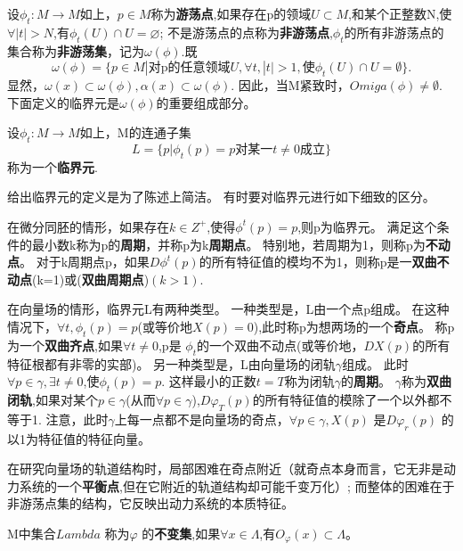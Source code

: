 \begin{defination}
  设\(\phi_t:M\to M\)如上，\(p \in M\)称为\textbf{游荡点},如果存在p的领域\(U\subset M\),和某个正整数N,使\(\forall |t|>N\),有\(\phi_t(U)\cap U=\varnothing\);
  不是游荡点的点称为\textbf{非游荡点},\(\phi_t\)的所有非游荡点的集合称为\textbf{非游荡集}，记为\(\omega(\phi)\).既
  \[
    \omega(\phi)=\{
    p \in M| \text{对p的任意领域} U,\forall t ,|t|>1,\text{使} \phi_t(U)
    \cap U =\emptyset
    \}.
  \]
显然，\(\omega(x)\subset \omega (\phi),\alpha(x)\subset\omega (\phi)\).
因此，当M紧致时，\(Omiga(\phi)\neq \emptyset\).
下面定义的临界元是\(\omega(\phi)\)的重要组成部分。
\end{defination}

\begin{defination}
  设\(\phi_t:M\to M\)如上，M的连通子集
  \[L=\{p|\phi_t(p)=p对某一t\neq 0成立\}\]
  称为一个\textbf{临界元}.
\end{defination}
给出临界元的定义是为了陈述上简洁。
有时要对临界元进行如下细致的区分。


在微分同胚的情形，如果存在\(k \in Z^+\),使得\(\phi^t(p)=p\),则p为临界元。
满足这个条件的最小数k称为p的\textbf{周期}，并称p为k\textbf{周期点}。
特别地，若周期为1，则称p为\textbf{不动点}。
对于k周期点p，如果\(D\phi^t(p)\)的所有特征值的模均不为1，则称p是一\textbf{双曲不动点}(k=1)或(\textbf{双曲周期点})\((k>1)\).


在向量场的情形，临界元L有两种类型。
一种类型是，L由一个点p组成。
在这种情况下，\(\forall t,\phi_t(p)=p\)(或等价地\(X(p)=0\)),此时称p为想两场的一个\textbf{奇点}。
称p为一个\textbf{双曲齐点},如果\(\forall t \neq 0\),p是 \(\phi_t\)的一个双曲不动点(或等价地，\(DX(p)\)的所有特征根都有非零的实部)。
另一种类型是，L由向量场的闭轨\(\gamma\)组成。
此时\(\forall p \in \gamma , \exists t \neq 0\),使\(\phi_t ( p ) = p\).
这样最小的正数\(t=T\)称为闭轨\(\gamma\)的\textbf{周期}。
\(\gamma\)称为\textbf{双曲闭轨},如果对某个\(p \in \gamma \)(从而\( \forall p \in \gamma\)),\(D \varphi _ { T } ( p )\)的所有特征值的模除了一个以外都不等于1.
注意，此时\(\gamma\)上每一点都不是向量场的奇点，\(\forall p \in \gamma , X ( p ) \) 是\( D\varphi _ { r } ( p )\) 的以1为特征值的特征向量。


在研究向量场的轨道结构时，局部困难在奇点附近（就奇点本身而言，它无非是动力系统的一个\textbf{平衡点},但在它附近的轨道结构却可能千变万化）;
而整体的困难在于非游荡点集的结构，它反映出动力系统的本质特征。

\begin{defination}
  M中集合\(Lambda\) 称为\(\varphi\) 的\textbf{不变集},如果\(\forall x \in \Lambda\),有$O _ { \varphi } ( x ) \subset \Lambda$。
\end{defination}

